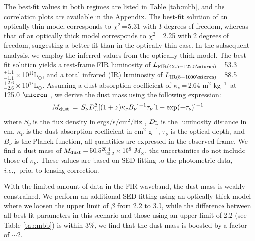 \documentclass[twocolumn,apj,numberedappendix]{emulateapj}
\newcommand{\Msun}{\mbox{$M_{\odot}$}}
\newcommand{\Lsun}{\mbox{L$_{\odot}$}}
\newcommand{\ie}{{\sl i.e.,~}}
\newcommand{\pmOne}{\mbox{$^{-1}$}}
\begin{document}

The best-fit values in both regimes are listed in Table \ref{tab:mbb}, and the correlation plots are available in the Appendix. The best-fit solution of an optically thin
model corresponds to $\chi^2$\,=\,5.31 with 3 degrees of freedom, whereas that of an optically thick model
corresponds to $\chi^2$\,=\,2.25 with 2 degrees of freedom, suggesting a better fit than in the optically thin
case. In the subsequent analysis, we employ the inferred values from the optically thick model.
The best-fit solution yields a rest-frame FIR luminosity of $L_{\rm FIR (42.5-122.5\micron)}$\,=\,53.3$^{+1.1}_{-1.1}\times$10$^{12}$\Lsun, and a total infrared (IR) luminosity of $L_{\rm IR (8-1000 \micron)}$\,=\,88.5$^{+2.6}_{-2.6}\times$10$
^{12}$\Lsun. Assuming a dust absorption coefficient of $\kappa_{\nu}$\,=\,2.64 m$^2$ kg\pmOne\ at 125.0 $
\micron$ \citep{Dunne03a}, we derive the dust mass using the following expression:
\begin{equation}
M_{\rm dust}\,=\,S_{\nu} D_{L}^2 [(1 + z) \kappa_{\nu} B_{\nu}]^{-1} \tau_{\nu} [1-
\exp(-\tau_{\nu})]^{-1}
\end{equation}
where $S_{\nu}$ is the flux density in ergs/s/cm$^{2}$/Hz , $D_{\rm L}$ is the luminosity distance in cm, $\kappa_{\nu}$ is the dust
absorption coefficient in cm$^2$ g\pmOne, $\tau_{\nu}$ is the optical depth, and $B_{\nu}$ is the Planck function,
all quantities are expressed in the observed-frame. We find a dust mass of $M_{\rm dust}$\,=\,50.5$^{20.4}_{-20.2}\times$10$^8$\,\,\Msun, the uncertainties do not include those of $\kappa_{\nu}$. These values are based on SED fitting to the photometric data, \ie prior
to lensing correction. 

With the limited amount of data in the FIR waveband, the dust mass is weakly constrained. 
We perform an additional SED fitting using an optically thick model where we loosen the upper limit of $\beta$ from 2.2 to 3.0, while the difference between all best-fit parameters in this scenario and those using an upper limit of 2.2 (see Table \ref{tab:mbb}) is within 3\%, we find that the dust mass is boosted by a factor of $\sim$2. 
\end{document}

